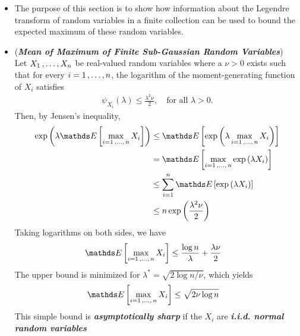 \documentclass[11pt]{article}
\begin{document}
\begin{itemize}
\item The purpose of this section is to show how information about the Legendre transform of random variables in a finite collection can be used to bound the expected maximum of these random variables.

\item \begin{remark} (\textbf{\emph{Mean of Maximum of Finite Sub-Gaussian Random Variables}})\\
Let $X_1 \,{,}\ldots{,}\, X_n$ be real-valued random variables where a $\nu  > 0$ exists such that for every $i = 1 \,{,}\ldots{,}\, n$, the logarithm of the moment-generating function of $X_i$ satisfies
\begin{align*}
\psi_{X_i}(\lambda) \le \frac{\lambda^2 \nu}{2}, \quad \text{for all $\lambda > 0$}.
\end{align*}
Then, by Jensen's inequality, 
\begin{align*}
\exp\paren{\lambda \E{}{\max\limits_{i=1 \xdotx{,} n} X_i}} &\le \E{}{\exp\paren{\lambda \max\limits_{i=1 \xdotx{,} n} X_i }} \\
&=  \E{}{\max\limits_{i=1 \xdotx{,} n}  \exp\paren{\lambda X_i }} \\
&\le  \sum_{i=1}^{n} \E{}{ \exp\paren{\lambda X_i }}\\
&\le n  \exp\paren{\frac{\lambda^2 \nu}{2}}
\end{align*}
Taking logarithms on both sides, we have
\begin{align*}
\E{}{\max\limits_{i=1 \xdotx{,} n} X_i} &\le \frac{\log n}{\lambda} + \frac{\lambda \nu}{2}
\end{align*} The upper bound is minimized for $\lambda^{*} = \sqrt{2 \log n/\nu}$, which yields
\begin{align}
\E{}{\max\limits_{i=1 \xdotx{,} n} X_i} &\le \sqrt{2 \nu \log n} \label{ineqn: maximal_finite_subgaussian}
\end{align}  This simple bound is \emph{\textbf{asymptotically sharp}} if the $X_i$ are \emph{\textbf{i.i.d. normal random variables}}
\end{remark}


\end{itemize}
\end{document}
